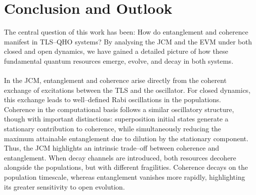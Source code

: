 \documentclass[11pt]{article}
\begin{document}
\section{Conclusion and Outlook} \label{sec:conc}
The central question of this work has been: How do entanglement and coherence manifest in TLS--QHO systems? By analysing the JCM and the EVM under both closed and open dynamics, we have gained a detailed picture of how these fundamental quantum resources emerge, evolve, and decay in both systems.\\
\\
In the JCM, entanglement and coherence arise directly from the coherent exchange of excitations between the TLS and the oscillator. For closed dynamics, this exchange leads to well–defined Rabi oscillations in the populations. Coherence in the computational basis follows a similar oscillatory structure, though with important distinctions: superposition initial states generate a stationary contribution to coherence, while simultaneously reducing the maximum attainable entanglement due to dilution by the stationary component. Thus, the JCM highlights an intrinsic trade–off between coherence and entanglement. When decay channels are introduced, both resources decohere alongside the populations, but with different fragilities. Coherence decays on the population timescale, whereas entanglement vanishes more rapidly, highlighting its greater sensitivity to open evolution.
\end{document}
